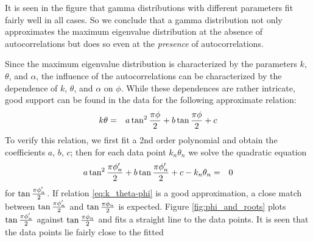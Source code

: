 It is seen in the figure that gamma distributions with different
parameters fit fairly well in all cases. So we conclude that a
gamma distribution not only approximates the maximum eigenvalue
distribution at the absence of autocorrelations but does so even at
the {\it presence} of autocorrelations.

Since the maximum eigenvalue distribution is characterized by the
parameters $k$, $\theta$, and $\alpha$, the influence of the
autocorrelations can be characterized by the dependence of $k$,
$\theta$, and  $\alpha$ on $\phi$. While these dependences are rather
intricate,
good support can be found in the data for the following
approximate relation:
\begin{eqnarray}
  k\theta &=& a \tan^2{\pi \phi \over 2} + b\tan{\pi \phi \over 2} +
  c \label{eq:k_theta-phi}
\end{eqnarray}
To verify this relation, we first fit a 2nd order polynomial and
obtain the coefficients $a$, $b$, $c$; then for each data point
$k_n\theta_n$ we solve the quadratic equation
\begin{eqnarray}
  a \tan^2{\pi \phi'_n \over 2} + b\tan{\pi \phi'_n \over 2} + c -
  k_n\theta_n &=& 0\label{eq:k_theta-phi_2}
\end{eqnarray}
for $\tan{\pi \phi'_n \over 2}$. If relation \ref{eq:k_theta-phi} is a
good approximation, a close match between $\tan{\pi \phi'_n \over 2}$
and $\tan{\pi \phi_n \over 2}$ is expected. Figure
\ref{fig:phi_and_roots} plots $\tan{\pi \phi'_n \over 2}$ against
$\tan{\pi \phi_n \over 2}$ and fits a straight line to the data
points. It is seen that the data points lie fairly close to the fitted
